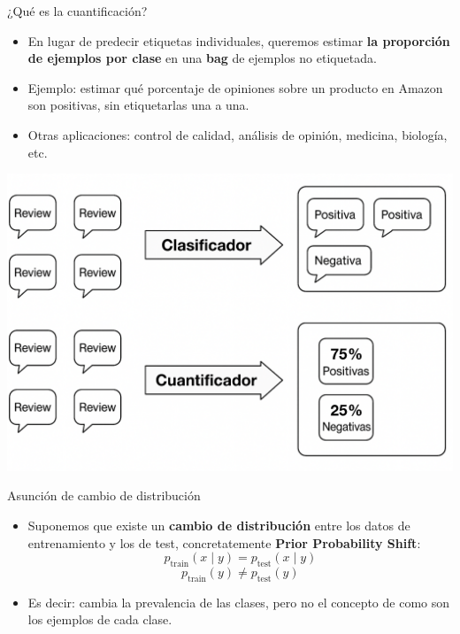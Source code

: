 \documentclass{beamer}
\begin{document}
\begin{frame}{¿Qué es la cuantificación?}
\begin{itemize}
    \item En lugar de predecir etiquetas individuales, queremos estimar \textbf{la proporción de ejemplos por clase} en una \textbf{bag} de ejemplos no etiquetada.
    \item Ejemplo: estimar qué porcentaje de opiniones sobre un producto en Amazon son positivas, sin etiquetarlas una a una.
    \item Otras aplicaciones: control de calidad, análisis de opinión, medicina, biología, etc.
\end{itemize}
\centering
\includegraphics[scale=0.13]{images/quantificaiton.png}
\end{frame}

\begin{frame}{Asunción de cambio de distribución}
\begin{itemize}
    \item Suponemos que existe un \textbf{cambio de distribución} entre los datos de entrenamiento y los de test, concretatemente \textbf{Prior Probability Shift}:
    \begin{equation}
        p_{\text{train}}(x \mid y) = p_{\text{test}}(x \mid y)
    \end{equation}
    \begin{equation}
        p_{\text{train}}(y) \neq p_{\text{test}}(y)
    \end{equation}
    \item Es decir: cambia la prevalencia de las clases, pero no el concepto de como son los ejemplos de cada clase.
\end{itemize}
\end{frame}
\end{document}
